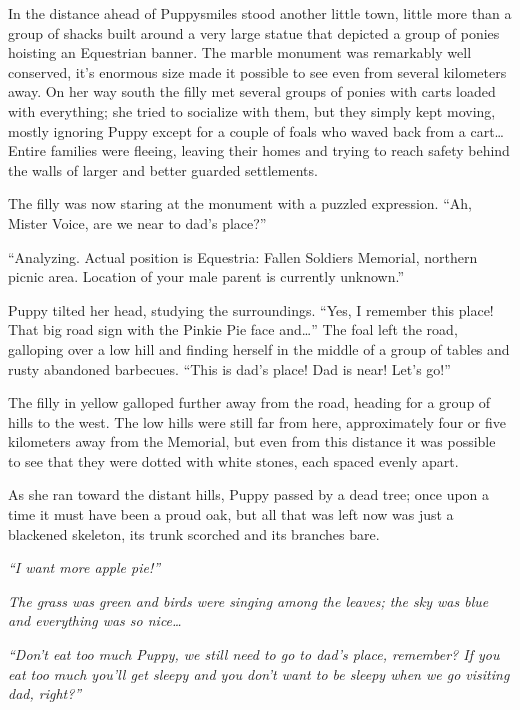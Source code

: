 \horizonline


In the distance ahead of Puppysmiles stood another little town, little more than a group of shacks built around a very large statue that depicted a group of ponies hoisting an Equestrian banner. The marble monument was remarkably well conserved, it's enormous size made it possible to see even from several kilometers away. On her way south the filly met several groups of ponies with carts loaded with everything; she tried to socialize with them, but they simply kept moving, mostly ignoring Puppy except for a couple of foals who waved back from a cart\dots Entire families were fleeing, leaving their homes and trying to reach safety behind the walls of larger and better guarded settlements.

The filly was now staring at the monument with a puzzled expression. ``Ah, Mister Voice, are we near to dad's place?''

``{\mt Analyzing. Actual position is Equestria: Fallen Soldiers Memorial, northern picnic area. Location of your male parent is currently unknown.}''

Puppy tilted her head, studying the surroundings. ``Yes, I remember this place! That big road sign with the Pinkie Pie face and\dots'' The foal left the road, galloping over a low hill and finding herself in the middle of a group of tables and rusty abandoned barbecues. ``This is dad's place! Dad is near! Let's go!''

The filly in yellow galloped further away from the road, heading for a group of hills to the west. The low hills were still far from here, approximately four or five kilometers away from the Memorial, but even from this distance it was possible to see that they were dotted with white stones, each spaced evenly apart.

As she ran toward the distant hills, Puppy passed by a dead tree; once upon a time it must have been a proud oak, but all that was left now was just a blackened skeleton, its trunk scorched and its branches bare.

\emph{``I want more apple pie!''}

\emph{The grass was green and birds were singing among the leaves; the sky was blue and everything was so nice\dots}

\emph{``Don't eat too much Puppy, we still need to go to dad's place, remember? If you eat too much you'll get sleepy and you don't want to be sleepy when we go visiting dad, right?''}

